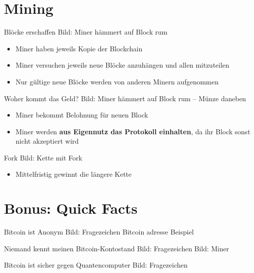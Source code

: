 \documentclass[aspectratio=169]{beamer}
\begin{document}
\section{Mining}

\begin{frame}{Blöcke erschaffen}
    Bild: Miner hämmert auf Block rum
    \begin{itemize}
        \item Miner haben jeweils Kopie der Blockchain
        \item Miner versuchen jeweils neue Blöcke anzuhängen und allen mitzuteilen
        \item Nur gültige neue Blöcke werden von anderen Minern aufgenommen
    \end{itemize}
\end{frame}


\begin{frame}{Woher kommt das Geld?}
    Bild: Miner hämmert auf Block rum -- Münze daneben
    \begin{itemize}
        \item Miner bekommt Belohnung für neuen Block
        \item Miner werden \textbf{aus Eigennutz das Protokoll einhalten}, da ihr Block sonst nicht akzeptiert wird
    \end{itemize}
\end{frame}


\begin{frame}{Fork}
    Bild: Kette mit Fork
    \begin{itemize}
        \item Mittelfristig gewinnt die längere Kette
    \end{itemize}
\end{frame}












\section{Bonus: Quick Facts}


\begin{frame}{Bitcoin ist Anonym}
    Bild: Fragezeichen
    \pause
    Bitcoin adresse Beispiel
\end{frame}


\begin{frame}{Niemand kennt meinen Bitcoin-Kontostand}
    Bild: Fragezeichen
    \pause
    Bild: Miner
\end{frame}


\begin{frame}{Bitcoin ist sicher gegen Quantencomputer}
    Bild: Fragezeichen
\end{frame}
\end{document}
